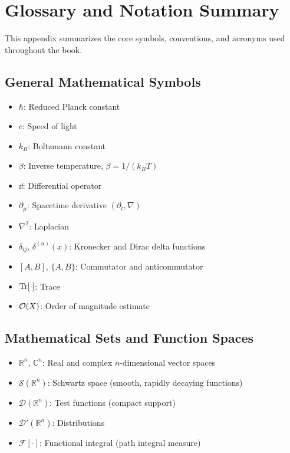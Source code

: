 \appendix

\chapter{Glossary and Notation Summary}
\label{app:notation}

This appendix summarizes the core symbols, conventions, and acronyms used throughout the book.

\section{General Mathematical Symbols}
\begin{itemize}
	\item \(\hbar\): Reduced Planck constant
	\item \(c\): Speed of light
	\item \(k_B\): Boltzmann constant
	\item \(\beta\): Inverse temperature, \(\beta = 1 / (k_B T)\)
	\item \(\dd\): Differential operator
	\item \(\partial_\mu\): Spacetime derivative \((\partial_t, \nabla)\)
	\item \(\nabla^2\): Laplacian
	\item \(\delta_{ij}\), \(\delta^{(n)}(x)\): Kronecker and Dirac delta functions
	\item \([A, B]\), \(\{A, B\}\): Commutator and anticommutator
	\item \(\Tr[\cdot]\): Trace
	\item \(\mathcal{O}(X)\): Order of magnitude estimate
\end{itemize}

\section{Mathematical Sets and Function Spaces}
\begin{itemize}
	\item \(\mathbb{R}^n\), \(\mathbb{C}^n\): Real and complex \(n\)-dimensional vector spaces
	\item \(\mathcal{S}(\mathbb{R}^n)\): Schwartz space (smooth, rapidly decaying functions)
	\item \(\mathcal{D}(\mathbb{R}^n)\): Test functions (compact support)
	\item \(\mathcal{D}'(\mathbb{R}^n)\): Distributions
	\item \(\mathcal{F}[\cdot]\): Functional integral (path integral measure)
\end{itemize}

